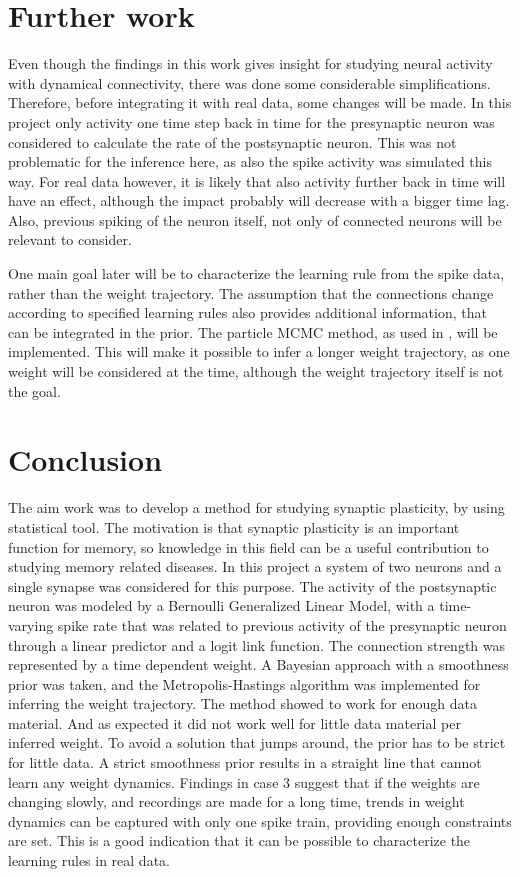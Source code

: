 \section{Further work}
\label{sec:FW}

Even though the findings in this work gives insight for studying neural activity with dynamical connectivity, there was done some considerable simplifications. Therefore, before integrating it with real data, some changes will be made. In this project only activity one time step back in time for the presynaptic neuron was considered to calculate the rate of the postsynaptic neuron. This was not problematic for the inference here, as also the spike activity was simulated this way. For real data however, it is likely that also activity further back in time will have an effect, although the impact probably will decrease with a bigger time lag. Also, previous spiking of the neuron itself, not only of connected neurons will be relevant to consider. 

One main goal later will be to characterize the learning rule from the spike data, rather than the weight trajectory. The assumption that the connections change according to specified learning rules also provides additional information, that can be integrated in the prior. The particle MCMC method, as used in \cite{Linderman}, will be implemented. This will make it possible to infer a longer weight trajectory, as one weight will be considered at the time, although the weight trajectory itself is not the goal. 


\section{Conclusion}
\label{sec:conclusion}

The aim work was to develop a method for studying synaptic plasticity, by using statistical tool. The motivation is that synaptic plasticity is an important function for memory, so knowledge in this field can be a useful contribution to studying memory related diseases. In this project a system of two neurons and a single synapse was considered for this purpose. The activity of the postsynaptic neuron was modeled by a Bernoulli Generalized Linear Model, with a time-varying spike rate that was related to previous activity of the presynaptic neuron through a linear predictor and a logit link function. The connection strength was represented by a time dependent weight. A Bayesian approach with a smoothness prior was taken, and the Metropolis-Hastings algorithm was implemented for inferring the weight trajectory. The method showed to work for enough data material. And as expected it did not work well for little data material per inferred weight. To avoid a solution that jumps around, the prior has to be strict for little data. A strict smoothness prior results in a straight line that cannot learn any weight dynamics. Findings in case 3 suggest that if the weights are changing slowly, and recordings are made for a long time, trends in weight dynamics can be captured with only one spike train, providing enough constraints are set. This is a good indication that it can be possible to characterize the learning rules in real data. 



